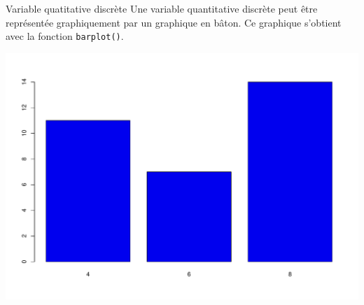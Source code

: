 \documentclass[
  8pt,
  ignorenonframetext,
]{beamer}
\newenvironment{Shaded}{\begin{snugshade}}{\end{snugshade}}
\newcommand{\AttributeTok}[1]{\textcolor[rgb]{0.77,0.63,0.00}{#1}}
\newcommand{\FunctionTok}[1]{\textcolor[rgb]{0.00,0.00,0.00}{#1}}
\newcommand{\NormalTok}[1]{#1}
\newcommand{\SpecialCharTok}[1]{\textcolor[rgb]{0.00,0.00,0.00}{#1}}
\newcommand{\StringTok}[1]{\textcolor[rgb]{0.31,0.60,0.02}{#1}}
\begin{document}
\begin{frame}[fragile]{Variable quatitative discrète}
\protect\hypertarget{variable-quatitative-discruxe8te}{}
Une variable quantitative discrète peut être représentée graphiquement
par un graphique en bâton. Ce graphique s'obtient avec la fonction
\texttt{barplot()}.

\begin{Shaded}
\end{Shaded}

\begin{center}\includegraphics[width=0.8\linewidth]{Chap2_R_files/figure-beamer/unnamed-chunk-20-1} \end{center}
\end{frame}
\end{document}
